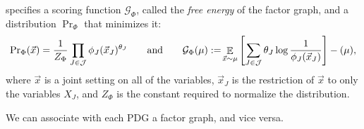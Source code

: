 \documentclass{article}
\theoremstyle{plain}
\theoremstyle{definition}
\theoremstyle{remark}
\let\H\relax
\DeclareMathOperator{\H}{\mathrm{H}} %
\DeclareMathOperator*{\E}{\mathbb{E}} %
\numberwithin{equation}{section}
\begin{document}
\begin{defn}
specifies a scoring function $\mathcal G_\Phi$, called the 
\emph{free energy} \cite{KF09} of the factor graph, and a distribution
${\Pr}_{\Phi}$ that minimizes it: 
\[ {\Pr}_{\Phi}(\vec x)
		= \frac{1}{Z_\Phi} \prod_{J \in \cal J} \phi_J(\vec
                                x_J)^{\theta_J} %
	\qquad\text{and}\qquad
	\mathcal G_\Phi(\mu) := \!\E_{\vec x\sim\mu}\left[  \sum_{J \in
                   \cal J} \theta_J \log\frac1{\phi_J(\vec
                   x_J)}\right] - \H(\mu)  , \]
	where $\vec{x}$ is a joint setting on all of the variables,
        $\vec{x}_J$ is the restriction of $\vec{x}$ to only the
        variables $X_J$, and $Z_\Phi$ is the constant required to
        normalize the distribution.  
\end{defn}
We can associate with each PDG a factor graph, and vice versa.
\end{document}
